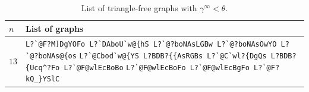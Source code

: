 \documentclass[11pt]{article}
\begin{document}
	\begin{table}[h!]
		\small
		\begin{center}
			\caption{List of triangle-free graphs with $\gamma^\infty<\theta$.}
			\label{Appendix:TriangleFree}
			\begin{tabular}{|p{0.5cm} | p{14.5cm}|}
				\hline
				$n$ & List of graphs \\
				\hline
				\hline
				$13$ & 
				\verb|L?`@F?M]DgYOFo L?`DAboU`w@{hS L?`@?boNAsLGBw L?`@?boNAsOwYO L?`@?boNAs@{os| 
				\verb|L?`@Cbod`w@{YS L?BDB?{{AsRGBs L?`@C`wl?{DgQs L?BDB?{Ucq^?Fo L?`@F@wlEcBoBo| 
				\verb|L?`@F@wlEcBoFo L?`@F@wlEcBgFo L?`@F?kQ_}YSlC| \\
				\hline
			\end{tabular}
		\end{center}
	\end{table}

\end{document}
